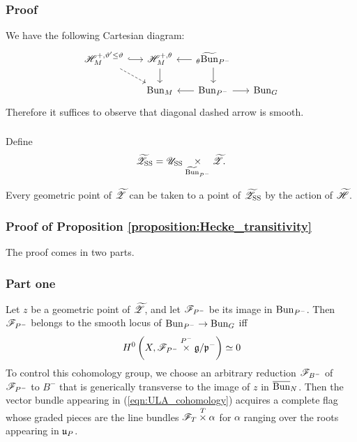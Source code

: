 \subsubsection{Proof} We have the following Cartesian diagram:
\[
\begin{tikzcd}[
  column sep={1.5em},
  row sep={1.5em}
]
  \HH_M^{+, \vartheta' \le \vartheta} \arrow[r, hook] \arrow[dr, dashed] & \HH_M^{+, \theta} \arrow[d] & {}_\theta \Bunt_{P^-} \arrow[l] \arrow[d] & \\
  & \Bun_M & \Bun_{P^-} \arrow[l] \arrow[r] & \Bun_G
\end{tikzcd}
\]
Therefore it suffices to observe that diagonal dashed arrow is smooth.

\subsubsection{} Define
    \[{\widetilde{\mathscr{Z}}}_{\mathrm{SS}} = \mathscr{U}_{\mathrm{SS}} \underset{\widetilde{\mathrm{Bun}}_{P^-}}{\times} {\widetilde{\mathscr{Z}}}.\]

\begin{proposition}
\label{proposition:Hecke_transitivity}
Every geometric point of ${\widetilde{\mathscr{Z}}}$ can be taken to a point of ${\widetilde{\mathscr{Z}}}_{\mathrm{SS}}$ by the action of $\widetilde{\mathscr{H}}$.
\end{proposition}

\subsubsection{Proof of Proposition \ref{proposition:Hecke_transitivity}} The proof comes in two parts.

\subsubsection{Part one} Let $z$ be a geometric point of ${\widetilde{\mathscr{Z}}}$, and let $\mathscr{F}_{P^-}$ be its image in $\mathrm{Bun}_{P^-}$. Then $\mathscr{F}_{P^-}$ belongs to the smooth locus of $\mathrm{Bun}_{P^-} \to \mathrm{Bun}_G$ iff
\begin{equation}
\label{eqn:ULA_cohomology}  
    H^0\left(X, \mathscr{F}_{P^-} \overset{P^-}{\times} \mathfrak{g}/\mathfrak{p}^- \right) \simeq 0
\end{equation}
To control this cohomology group, we choose an arbitrary reduction $\mathscr{F}_{B^-}$ of $\mathscr{F}_{P^-}$ to $B^-$ that is generically transverse to the image of $z$ in $\overline{\mathrm{Bun}}_N$. Then the vector bundle appearing in (\ref{eqn:ULA_cohomology}) acquires a complete flag whose graded pieces are the line bundles $\mathscr{F}_T \overset{T}{\times} \alpha$ for $\alpha$ ranging over the roots appearing in $\mathfrak{u}_P$.

